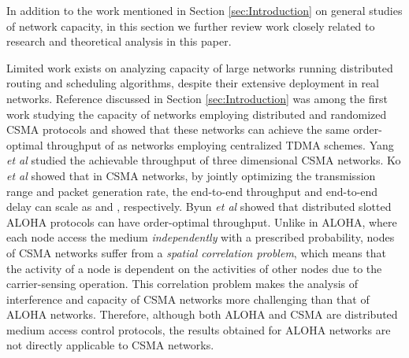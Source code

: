 \documentclass[english]{IEEEtran}
\theoremstyle{plain}
\theoremstyle{plain}
\theoremstyle{plain}
\theoremstyle{remark}
\begin{document}
In addition to the work mentioned in Section \ref{sec:Introduction}
on general studies of network capacity, in this section we further
review work closely related to research and theoretical analysis in
this paper.

Limited work exists on analyzing capacity of large networks running
distributed routing and scheduling algorithms, despite their extensive
deployment in real networks. Reference \cite{Chau11Capacity} discussed
in Section \ref{sec:Introduction} was among the first work studying
the capacity of networks employing distributed and randomized CSMA
protocols and showed that these networks can achieve the same order-optimal
throughput of  as networks
employing centralized TDMA schemes. Yang \emph{et al} \cite{Yang12Capacity}
studied the achievable throughput of three dimensional CSMA networks.
Ko \emph{et al} \cite{Ko13Optimization} showed that in CSMA networks,
by jointly optimizing the transmission range and packet generation
rate, the end-to-end throughput and end-to-end delay can scale as
 and ,
respectively. Byun \emph{et al} \cite{Byun13Delay} showed that distributed
slotted ALOHA protocols can have order-optimal throughput. Unlike
in ALOHA, where each node access the medium \emph{independently} with
a prescribed probability, nodes of CSMA networks suffer from a\emph{
spatial correlation problem}, which means that the activity of a node
is dependent on the activities of other nodes due to the carrier-sensing
operation. This correlation problem makes the analysis of interference
and capacity of CSMA networks more challenging than that of ALOHA
networks. Therefore, although both ALOHA and CSMA are distributed
medium access control protocols, the results obtained for ALOHA networks
are not directly applicable to CSMA networks.
\end{document}

